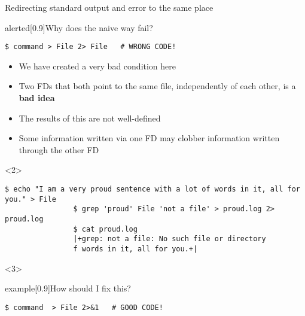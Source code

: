 \begin{frame}[fragile]{Redirecting standard output and error to the same place}
    \vspace{-7mm}
    \begin{overlayarea}{\textwidth}{0.5\textheight}
        \begin{varblock}{alerted}[0.9\textwidth]{Why does the naive way fail?}
            \begin{lstlisting}[style=MyBash, numbers=none, aboveskip=2mm, belowskip=-5mm]
                $ command > File 2> File   # WRONG CODE!
            \end{lstlisting}
        \end{varblock}
        \begin{itemize}[<only@1>]
            \item We have created a very bad condition here
            \item Two FDs that both point to the same file, independently of each other, is a \textbf{bad idea}
            \item The results of this are not well-defined
            \item Some information written via one FD may clobber information written through the other FD\\[-0.5em]
        \end{itemize}
        \begin{onlyenv}<2>
            \begin{lstlisting}[style=MyBash, numbers=none, aboveskip=0pt]
                $ echo "I am a very proud sentence with a lot of words in it, all for you." > File
                $ grep 'proud' File 'not a file' > proud.log 2> proud.log
                $ cat proud.log
                |+grep: not a file: No such file or directory
                f words in it, all for you.+|
            \end{lstlisting}
        \end{onlyenv}
        \begin{onlyenv}<3>
            \vspace{-2mm}
            \begin{varblock}{example}[0.9\textwidth]{How should I fix this?}
                \begin{lstlisting}[style=MyBash, numbers=none, aboveskip=2mm, belowskip=-5mm, xleftmargin=3mm, xrightmargin=3mm]
                    $ command  > File 2>&1   # GOOD CODE!

\end{lstlisting}
\end{varblock}
\end{onlyenv}
\end{overlayarea}
\end{frame}
